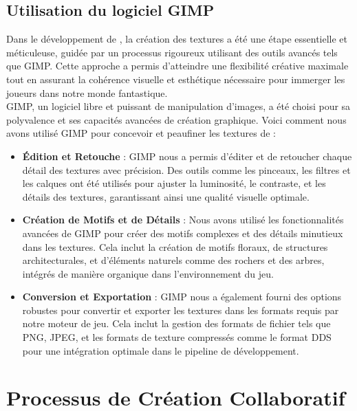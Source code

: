 \subsection{Utilisation du logiciel GIMP}

Dans le développement de \gameName, la création des textures a été une étape essentielle et méticuleuse, 
guidée par un processus rigoureux utilisant des outils avancés tels que GIMP. Cette approche a permis d'atteindre une flexibilité
 créative maximale tout en assurant la cohérence visuelle et esthétique nécessaire pour immerger les joueurs dans notre monde fantastique.
\\

GIMP, un logiciel libre et puissant de manipulation d'images, a été choisi pour sa polyvalence et ses capacités avancées de création graphique.
 Voici comment nous avons utilisé GIMP pour concevoir et peaufiner les textures de \gameName :
\\

\begin{itemize}
    \item \textbf{Édition et Retouche} : GIMP nous a permis d'éditer et de retoucher chaque détail des textures avec précision. Des outils comme les pinceaux, les filtres et les calques ont été utilisés pour ajuster la luminosité, le contraste, et les détails des textures, garantissant ainsi une qualité visuelle optimale.
    \\

    \item \textbf{Création de Motifs et de Détails} : Nous avons utilisé les fonctionnalités avancées de GIMP pour créer des motifs complexes et des détails minutieux dans les textures. Cela inclut la création de motifs floraux, de structures architecturales, et d'éléments naturels comme des rochers et des arbres, intégrés de manière organique dans l'environnement du jeu.
    \\

    \item \textbf{Conversion et Exportation} : GIMP nous a également fourni des options robustes pour convertir et exporter les textures dans les formats requis par notre moteur de jeu. Cela inclut la gestion des formats de fichier tels que PNG, JPEG, et les formats de texture compressés comme le format DDS pour une intégration optimale dans le pipeline de développement.
\end{itemize}

\section*{Processus de Création Collaboratif}

